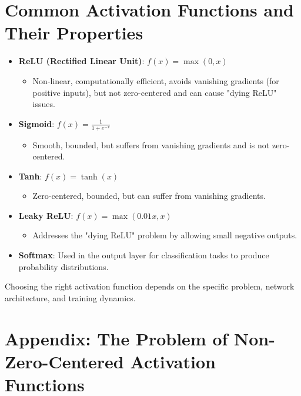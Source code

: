 \begin{notechapter}
\section{Common Activation Functions and Their Properties}
\begin{itemize}
    \item \textbf{ReLU (Rectified Linear Unit)}: 
          \( f(x) = \max(0, x) \)
          \begin{itemize}
              \item Non-linear, computationally efficient, 
                    avoids vanishing gradients (for positive 
                    inputs), but not zero-centered and can 
                    cause "dying ReLU" issues.
          \end{itemize}
    \item \textbf{Sigmoid}: 
          \( f(x) = \frac{1}{1 + e^{-x}} \)
          \begin{itemize}
              \item Smooth, bounded, but suffers from 
                    vanishing gradients and is not zero-
                    centered.
          \end{itemize}
    \item \textbf{Tanh}: 
          \( f(x) = \tanh(x) \)
          \begin{itemize}
              \item Zero-centered, bounded, but can suffer 
                    from vanishing gradients.
          \end{itemize}
    \item \textbf{Leaky ReLU}: 
          \( f(x) = \max(0.01x, x) \)
          \begin{itemize}
              \item Addresses the "dying ReLU" problem by 
                    allowing small negative outputs.
          \end{itemize}
    \item \textbf{Softmax}: Used in the output layer for 
          classification tasks to produce probability 
          distributions.
\end{itemize}

Choosing the right activation function depends on the 
specific problem, network architecture, and training 
dynamics.

\chapterappendix
\section{Appendix: The Problem of Non-Zero-Centered Activation Functions}


\end{notechapter}
